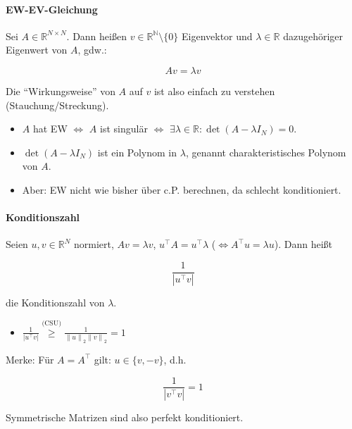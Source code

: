 \documentclass[a4paper, 14pt]{article}
\newcommand{\norm}[1]{\left\lVert#1\right\rVert}
\begin{document}
	\paragraph{EW-EV-Gleichung}

	Sei $A \in \mathbb{R}^{N \times N}$. Dann heißen $v \in \mathbb{R^N} \setminus \{ 0 \}$ Eigenvektor und $\lambda \in \mathbb{R}$ dazugehöriger Eigenwert von $A$, gdw.:

	\begin{equation}
		A v = \lambda v
	\end{equation}

	Die \enquote{Wirkungsweise} von $A$ auf $v$ ist also einfach zu verstehen (Stauchung/Streckung).

	\begin{itemize}
		\item $A$ hat EW $\Leftrightarrow$ $A$ ist singulär $\Leftrightarrow$ $\exists \lambda \in \mathbb{R} : \det(A - \lambda I_N) = 0$.
		\item $\det(A - \lambda I_N)$ ist ein Polynom in $\lambda$, genannt charakteristisches Polynom von $A$.
		\item Aber: EW nicht wie bisher über c.P. berechnen, da schlecht konditioniert.
	\end{itemize}

	\paragraph{Konditionszahl}

	Seien $u, v \in \mathbb{R}^N$ normiert, $A v = \lambda v$, $u^\top A = u^\top \lambda$ ($\Leftrightarrow A^\top u = \lambda u$).
	Dann heißt

	\begin{equation}
		\frac{1}{|u^{\top} v|}
	\end{equation}

	die Konditionszahl von $\lambda$.

	\begin{itemize}
		\item $\frac{1}{|u^{\top} v|} \stackrel{\textrm{(CSU)}}{\geq} \frac{1}{\norm{u}_2 \norm{v}_2} = 1$
	\end{itemize}

	Merke: Für $A = A^\top$ gilt: $u \in \{ v, -v \}$, d.h.
	
	\begin{equation}
		\frac{1}{|v^\top v|} = 1
	\end{equation}

	Symmetrische Matrizen sind also perfekt konditioniert.
\end{document}
